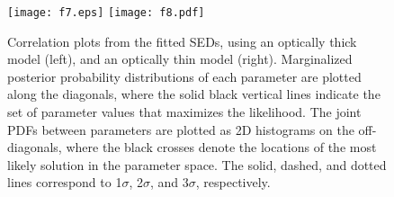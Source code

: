 \documentclass[iop]{emulateapj}
\begin{document}
\begin{figure}[!tbph]
\centering
\hspace{-1.1cm}
\texttt{[image: f7.eps]}
\hspace{-1cm}
\texttt{[image: f8.pdf]}
\hspace{-1.1cm}
\caption{Correlation plots from the fitted SEDs, using an optically thick
model (left), and an optically thin model (right). Marginalized posterior probability
distributions of each
parameter are plotted along the diagonals, where the solid black vertical lines indicate the set of parameter values that maximizes the likelihood. The joint PDFs between parameters are plotted as 2D histograms on the off-diagonals, where the black crosses denote the
locations of the most likely solution in the parameter space. The solid, dashed, and dotted lines correspond to 1$\sigma$, 2$\sigma$, and $3\sigma$, respectively. 
\label{fig:sedlikelihood}}
\end{figure}
\end{document}
